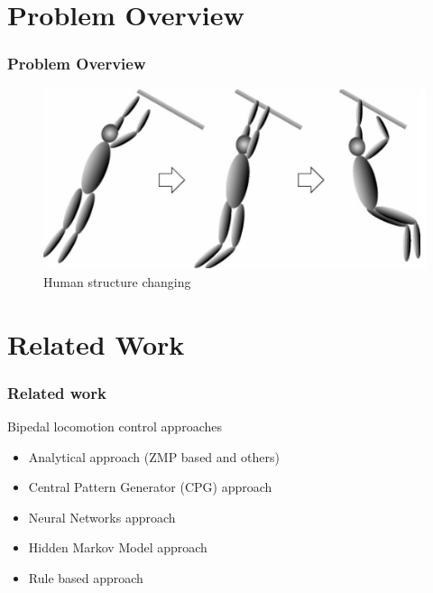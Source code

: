 \documentclass{beamer}
\begin{document}
	\section*{Problem Overview}
	\begin{frame}
		\frametitle{Problem Overview}
		\begin{figure}[h!]
			\begin{minipage}[H]{\linewidth}
				\centering
				\includegraphics[scale=0.5]{presentation_images/32}
				\caption{Human structure changing}
			\end{minipage}
		\end{figure}
	\end{frame}
		

	\section*{Related Work}
	\begin{frame}
		\frametitle{Related work}
		\begin{block}{Bipedal locomotion control approaches}
			\begin{itemize}
				\item
					Analytical approach (ZMP based and others)
				\item
					Central Pattern Generator (CPG) approach
				\item
					Neural Networks approach
				\item 
					Hidden Markov Model approach
				\item
					Rule based approach
			\end{itemize}
		\end{block}
	\end{frame}

\end{document}
